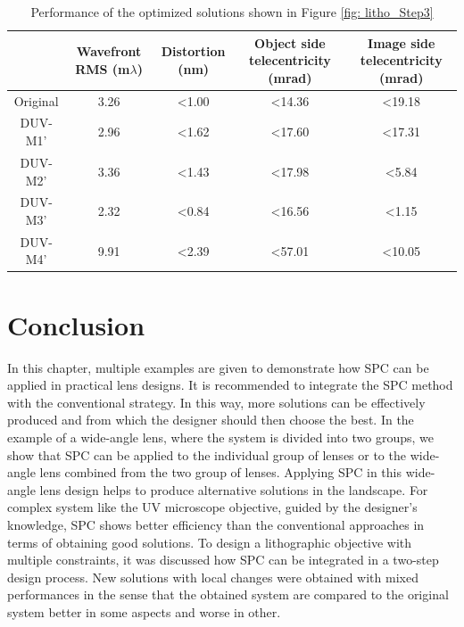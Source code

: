 \setlength{\arrayrulewidth}{.5mm}
\setlength{\tabcolsep}{18pt}
\renewcommand{\arraystretch}{1.2}
\begin{table}[h!]
    \centering
    \captionsetup{justification=centering}
    \caption{Performance of the optimized solutions shown in Figure \ref{fig: litho_Step3}}
    \label{table: Litho_final_solution}
    \vspace{-1em}
    \begin{adjustbox}{max width=\textwidth, center}
    \begin{tabular}{c c c c c}
    \hline 
       & \textbf{Wavefront RMS (m$\lambda$)} & \textbf{Distortion (nm)} & \textbf{Object side telecentricity (mrad)} & \textbf{Image side telecentricity (mrad)} \\ 
     \midrule
    Original & 3.26 & <1.00 & <14.36 & <19.18 \\ 
    \midrule
    DUV-M1' & 2.96 & <1.62 & <17.60 & <17.31 \\ 
    \midrule
    DUV-M2' & 3.36 & <1.43 & <17.98 & <5.84 \\ 
    \midrule
    DUV-M3' & 2.32 & <0.84 & <16.56 & <1.15 \\ 
    \midrule
    DUV-M4' & 9.91 & <2.39 & <57.01 & <10.05\\
    \hline
    \end{tabular}
    \end{adjustbox}
\end{table}


\section{Conclusion}
In this chapter, multiple examples are given to demonstrate how SPC can be applied in practical lens designs. It is recommended to integrate the SPC method with the conventional strategy. In this way, more solutions can be effectively produced and from which the designer should then choose the best. In the example of a wide-angle lens, where the system is divided into two groups, we show that SPC can be applied to the individual group of lenses or to the wide-angle lens combined from the two group of lenses. Applying SPC in this wide-angle lens design helps to produce alternative solutions in the landscape. For complex system like the UV microscope objective, guided by the designer's knowledge, SPC shows better efficiency than the conventional approaches in terms of obtaining good solutions. To design a lithographic objective with multiple constraints, it was discussed how SPC can be integrated in a two-step design process. New solutions with local changes were obtained with mixed performances in the sense that the obtained system are compared to the original system better in some aspects and worse in other. 

